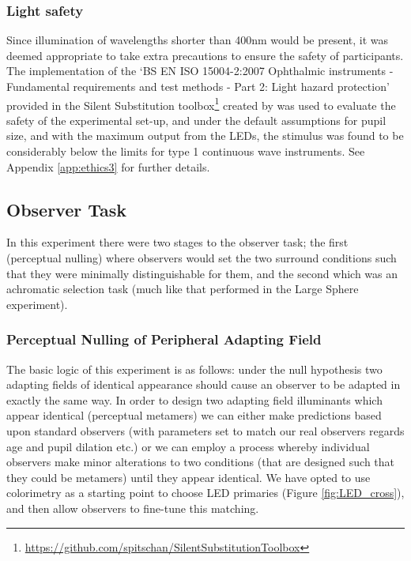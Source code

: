 \subsubsection{Light safety}
Since illumination of wavelengths shorter than 400nm would be present, it was deemed appropriate to take extra precautions to ensure the safety of participants. 
The implementation of the `BS EN ISO 15004-2:2007 Ophthalmic instruments - Fundamental requirements and test methods - Part 2: Light hazard protection' \citep{iso/tc_172/sc_7_ophthalmic_optics_and_instruments_bs_2007} provided in the Silent Substitution toolbox\footnote{\url{https://github.com/spitschan/SilentSubstitutionToolbox}} created by \citet{spitschan_selective_2015} was used to evaluate the safety of the experimental set-up, and under the default assumptions for pupil size, and with the maximum output from the LEDs, the stimulus was found to be considerably below the limits for type 1 continuous wave instruments. See Appendix \ref{app:ethics3} for further details.


\subsection{Observer Task}

In this experiment there were two stages to the observer task; the first (perceptual nulling) where observers would set the two surround conditions such that they were minimally distinguishable for them, and the second which was an achromatic selection task (much like that performed in the Large Sphere experiment).

\subsubsection{Perceptual Nulling of Peripheral Adapting Field} \label{sec:null}

The basic logic of this experiment is as follows: under the null hypothesis two adapting fields of identical appearance should cause an observer to be adapted in exactly the same way. In order to design two adapting field illuminants which appear identical (perceptual metamers) we can either make predictions based upon standard observers (with parameters set to match our real observers regards age and pupil dilation etc.) or we can employ a process whereby individual observers make minor alterations to two conditions (that are designed such that they could be metamers) until they appear identical. We have opted to use colorimetry as a starting point to choose LED primaries (Figure \ref{fig:LED_cross}), and then allow observers to fine-tune this matching.

